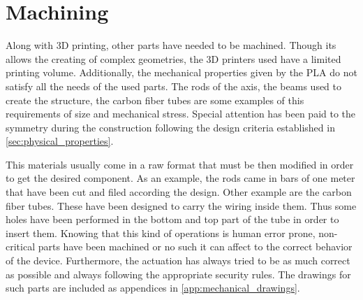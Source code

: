\section{Machining} %
\label{sec:machining}
Along with 3D printing, other parts have needed to be machined.
Though its allows the creating of complex geometries, the 3D printers used have a limited printing volume.
Additionally, the mechanical properties given by the PLA do not satisfy all the needs of the used parts.
The rods of the axis, the beams used to create the structure, the carbon fiber tubes are some examples of this requirements of size and mechanical stress.
Special attention has been paid to the symmetry during the construction following the design criteria established in \ref{sec:physical_properties}.

This materials usually come in a raw format that must be then modified in order to get the desired component.
As an example, the rods came in bars of one meter that have been cut and filed according the design.
Other example are the carbon fiber tubes.
These have been designed to carry the wiring inside them.
Thus some holes have been performed in the bottom and top part of the tube in order to insert them.
Knowing that this kind of operations is human error prone, non-critical parts have been machined or no such it can affect to the correct behavior of the device.
Furthermore, the actuation has always tried to be as much correct as possible and always following the appropriate security rules.
The drawings for such parts are included as appendices in \ref{app:mechanical_drawings}.

